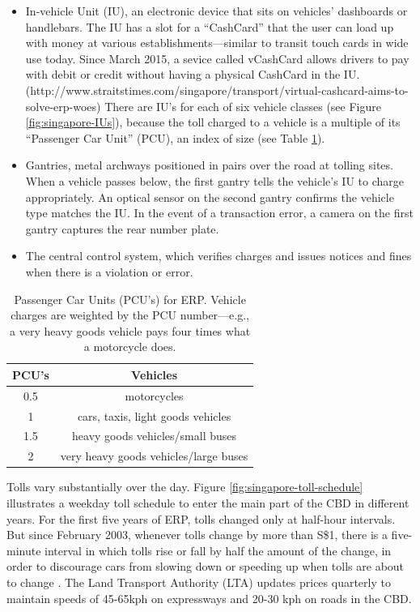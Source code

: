 \begin{itemize}
\item In-vehicle Unit (IU), an electronic device that sits on vehicles' dashboards or handlebars. The IU has a slot for a ``CashCard'' that the user can load up with money at various establishments---similar to transit touch cards in wide use today. Since March 2015, a sevice called vCashCard allows drivers to pay with debit or credit without having a physical CashCard in the IU. (http://www.straitstimes.com/singapore/transport/virtual-cashcard-aims-to-solve-erp-woes) There are IU's for each of six vehicle classes (see Figure \ref{fig:singapore-IUs}), because the toll charged to a vehicle is a multiple of its ``Passenger Car Unit'' (PCU), an index of size (see Table \ref{tab:passenger-car-units}). 

\item Gantries, metal archways positioned in pairs over the road at tolling sites. When a vehicle passes below, the first gantry tells the vehicle's IU to charge appropriately. An optical sensor on the second gantry confirms the vehicle type matches the IU. In the event of a transaction error, a camera on the first gantry captures the rear number plate. 

\item The central control system, which verifies charges and issues notices and fines when there is a violation or error.
\end{itemize}

\begin{table}
	\begin{tabular}{|c|c|}
		\hline 
		PCU's & Vehicles\tabularnewline                              
		\hline 
		\hline 
		0.5   & motorcycles\tabularnewline                           
		\hline 
		1     & cars, taxis, light goods vehicles\tabularnewline     
		\hline 
		1.5   & heavy goods vehicles/small buses\tabularnewline      
		\hline 
		2     & very heavy goods vehicles/large buses\tabularnewline 
		\hline 
	\end{tabular}
	
	\caption{
	Passenger Car Units (PCU's) for ERP. Vehicle charges are weighted by the PCU number---e.g., a very heavy goods vehicle pays four times what a motorcycle does. \citep{LTA2016} 
	}
	\label{tab:passenger-car-units}
\end{table}

Tolls vary substantially over the day. Figure \ref{fig:singapore-toll-schedule} illustrates a weekday toll schedule to enter the main part of the CBD in different years. For the first five years of ERP, tolls changed only at half-hour intervals. But since February 2003, whenever tolls change by more than S\$1, there is a five-minute interval in which tolls rise or fall by half the amount of the change, in order to discourage cars from slowing down or speeding up when tolls are about to change \citep{Menon2004}. The Land Transport Authority (LTA) updates prices quarterly to maintain speeds of 45-65kph on expressways and 20-30 kph on roads in the CBD.
	
